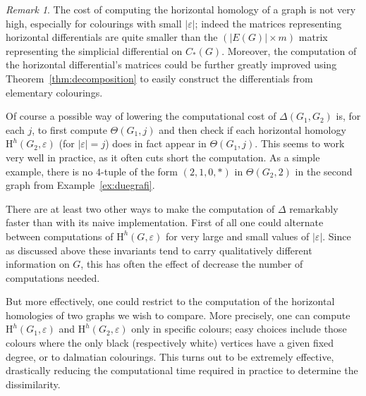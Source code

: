 \documentclass[11pt, a4paper, reqno, twoside, makeidx]{amsart}
\theoremstyle{remark}
\newtheorem{rmk}{Remark}[section]
\theoremstyle{plain}
\theoremstyle{definition}
\newcommand{\HH}{\mathrm{H}}
\begin{document}
\begin{rmk}
The cost of computing the horizontal homology of a graph is not very high, especially for colourings with small $|\varepsilon|$; indeed the matrices representing horizontal differentials are quite smaller than the  $(|E(G)|\times m)$ matrix representing the simplicial differential on $C_*(G)$. Moreover, the computation of the horizontal differential's matrices could be further greatly improved using Theorem~\ref{thm:decomposition} to easily construct the differentials from elementary colourings.

Of course a possible way of lowering the computational cost of $\Delta(G_1, G_2)$ is, for each $j$, to first compute $\Theta(G_1,j)$ and then check if each horizontal homology $\HH^h(G_2, \varepsilon)$ (for $|\varepsilon| = j$) does in fact appear in $\Theta(G_1,j)$.
This seems to work very well in practice, as it often cuts short the computation. As a simple example, there is no $4$-tuple of the form $(2,1,0,*)$ in $\Theta(G_2,2)$ in the second graph from Example~\ref{ex:duegrafi}.

There are at least two other ways to make the computation of $\Delta$ remarkably faster than with its naive implementation. First of all one could alternate between computations of $\HH^h(G, \varepsilon)$ for very large and small values of $|\varepsilon|$. Since as discussed above these invariants tend to carry qualitatively different information on $G$, this has often the effect of decrease the number of computations needed.

But more effectively, one could restrict to the computation of the horizontal homologies of two graphs we wish to compare. More precisely, one can compute $\HH^h(G_1, \varepsilon)$ and $\HH^h(G_2, \varepsilon)$ only in specific colours; easy choices include those colours where the only black (respectively white) vertices have a given fixed degree, or to dalmatian colourings. This turns out to be extremely effective, drastically reducing the computational time required in practice to determine the dissimilarity.
\end{rmk}
\end{document}
